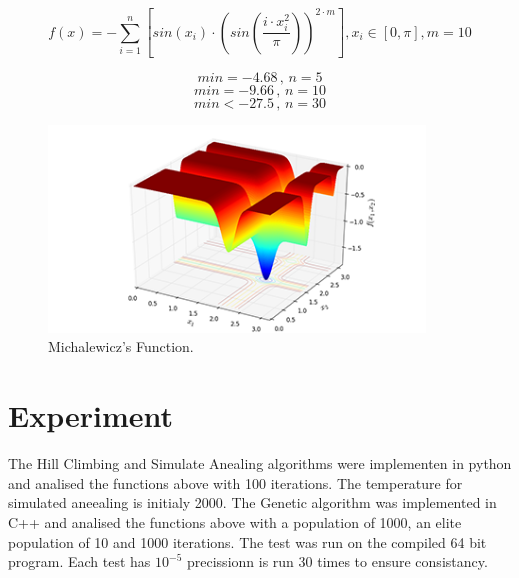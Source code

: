 \documentclass{report}
\begin{document}
\pagebreak

\begin{figure}[!h]
  \centering
  $$ f(x) = -\sum_{i=1}^n \left[sin(x_i) \cdot \left( sin\left( \frac{i \cdot x_i^2}{\pi}  \right) \right)^{2 \cdot m} \right] ,
  x_i \in \left[ 0, \pi \right] ,  m = 10$$

   $$min = -4.68 \, , \, n = 5$$
   $$min = -9.66 \, , \, n = 10$$
   $$min < -27.5 \, , \, n = 30$$

  \includegraphics[width=100mm,scale=0.5]{Michalewicz_functions}
  \caption{Michalewicz's Function. \protect\footnotemark}
\end{figure}

\pagebreak

\section*{Experiment}

The Hill Climbing and Simulate Anealing algorithms were implementen in python and analised the functions above with 100 iterations. The temperature for simulated aneealing is initialy 2000.
\newline
The Genetic algorithm was implemented in C++ and analised the functions above with a population of 1000, an elite population of 10 and 1000 iterations. The test was run on the compiled 64 bit program.
\newline
Each test has $10^{-5}$ precissionn is run 30 times to ensure consistancy.
\end{document}
